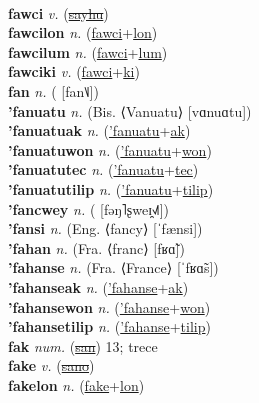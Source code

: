  \label{fepucocalulum} \\
\textbf{fawci} \textit{v.} (\hyperref[sayhu]{\sout{sayhu}})
 \label{fawci} \\
\textbf{fawcilon} \textit{n.} (\hyperref[fawci]{fawci}+\hyperref[lon]{lon})
 \label{fawcilon} \\
\textbf{fawcilum} \textit{n.} (\hyperref[fawci]{fawci}+\hyperref[lum]{lum})
 \label{fawcilum} \\
\textbf{fawciki} \textit{v.} (\hyperref[fawci]{fawci}+\hyperref[ki]{ki})
 \label{fawciki} \\
\textbf{fan} \textit{n.} ( [fan˥˩])
 \label{fan} \\
\textbf{'fanuatu} \textit{n.} (Bis. ⟨Vanuatu⟩ [vɑnuɑtu])
 \label{'fanuatu} \\
\textbf{'fanuatuak} \textit{n.} (\hyperref['fanuatu]{'fanuatu}+\hyperref[ak]{ak})
 \label{'fanuatuak} \\
\textbf{'fanuatuwon} \textit{n.} (\hyperref['fanuatu]{'fanuatu}+\hyperref[won]{won})
 \label{'fanuatuwon} \\
\textbf{'fanuatutec} \textit{n.} (\hyperref['fanuatu]{'fanuatu}+\hyperref[tec]{tec})
 \label{'fanuatutec} \\
\textbf{'fanuatutilip} \textit{n.} (\hyperref['fanuatu]{'fanuatu}+\hyperref[tilip]{tilip})
 \label{'fanuatutilip} \\
\textbf{'fancwey} \textit{n.} ( [fəŋ˥ʂweɪ̯˧˩˥])
 \label{'fancwey} \\
\textbf{'fansi} \textit{n.} (Eng. ⟨fancy⟩ [ˈfænsi])
 \label{'fansi} \\
\textbf{'fahan} \textit{n.} (Fra. ⟨franc⟩ [fʁɑ̃])
 \label{'fahan} \\
\textbf{'fahanse} \textit{n.} (Fra. ⟨France⟩ [ˈfʁɑ̃s])
 \label{'fahanse} \\
\textbf{'fahanseak} \textit{n.} (\hyperref['fahanse]{'fahanse}+\hyperref[ak]{ak})
 \label{'fahanseak} \\
\textbf{'fahansewon} \textit{n.} (\hyperref['fahanse]{'fahanse}+\hyperref[won]{won})
 \label{'fahansewon} \\
\textbf{'fahansetilip} \textit{n.} (\hyperref['fahanse]{'fahanse}+\hyperref[tilip]{tilip})
 \label{'fahansetilip} \\
\textbf{fak} \textit{num.} (\hyperref[san]{\sout{san}})
13; trece \label{fak} \\
\textbf{fake} \textit{v.} (\hyperref[sano]{\sout{sano}})
 \label{fake} \\
\textbf{fakelon} \textit{n.} (\hyperref[fake]{fake}+\hyperref[lon]{lon})
